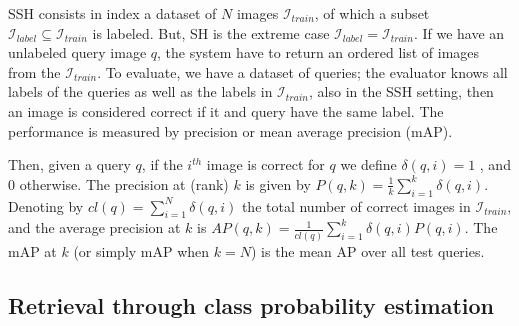\documentclass[conference]{IEEEtran}
\begin{document}
SSH consists in index a dataset of $N$ images $\mathcal{I}_{train}$, of which a subset $\mathcal{I}_{label} \subseteq \mathcal{I}_{train}$ is labeled.  But, SH is the extreme case $\mathcal{I}_{label} = \mathcal{I}_{train}$. If we have an unlabeled query image $q$, the system have to return an ordered list of images from the $\mathcal{I}_{train}$. To evaluate, we have a dataset of queries; the evaluator knows all labels of the queries as well as the labels in $\mathcal{I}_{train}$, also in the SSH setting, then an image is considered correct if it and query have the same label. The performance is measured by precision or mean average precision (mAP). 

Then, given a query $q$, if the $i^{th}$ image is correct for $q$ we define $\delta (q, i)=1$ , and $0$ otherwise. The precision at (rank) $k$ is given by $P(q,k) = \tfrac{1}{k} {\sum}_{i=1}^{k} \delta (q, i)$. Denoting by $cl(q) = {\sum}_{i=1}^{N} \delta (q, i)$ the total number of correct images in $\mathcal{I}_{train}$, and the average precision at $k$ is $AP(q, k) = \tfrac{1}{cl(q)}{\sum}_{i=1}^{k}\delta (q, i) P(q,i)$. The mAP at $k$ (or simply mAP when $k = N$) is the mean AP over all test queries.

\subsection{Retrieval through class probability estimation}
\end{document}

